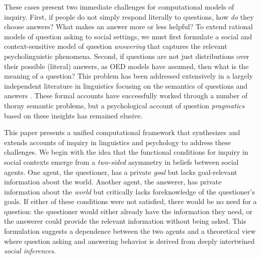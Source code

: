 \documentclass[11pt, floatsintext]{apa6}
\begin{document}

These cases present two immediate challenges for computational models of inquiry. 
First, if people do not simply respond literally to questions, how \emph{do} they choose answers? 
What makes an answer more or less helpful?
To extend rational models of question asking to social settings, we must first formulate a social and context-sensitive model of question \emph{answering} that captures the relevant psycholinguistic phenomena.
Second, if questions are not just distributions over their possible (literal) answers, as OED models have assumed, then what is the meaning of a question?
This problem has been addressed extensively in a largely independent literature in linguistics focusing on the semantics of questions and answers \cite{GroenendijkStokhof84_SemanticsOfQuestions,Ginzburg95_ResolvingQuestions,VanRooy03_QuestioningDecisionProblems,ciardelli2013inquisitive}. 
These formal accounts have successfully worked through a number of thorny semantic problems, but a psychological account of question \emph{pragmatics} based on these insights has remained elusive.

This paper presents a unified computational framework that synthesizes and extends accounts of inquiry in linguistics and psychology to address these challenges.
We begin with the idea that the functional conditions for inquiry in social contexts emerge from a \emph{two-sided} asymmetry in beliefs between social agents. 
One agent, the questioner, has a private \emph{goal} but lacks goal-relevant information about the world.
Another agent, the answerer, has private information about the \emph{world} but critically lacks foreknowledge of the questioner's goals.
If either of these conditions were not satisfied, there would be no need for a question: the questioner would either already have the information they need, or the answerer could provide the relevant information without being asked.
This formulation suggests a dependence between the two agents and a theoretical view where question asking and answering behavior is derived from deeply intertwined \emph{social inferences}.
\end{document}

